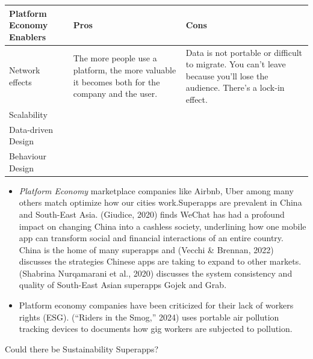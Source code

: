 \documentclass[
  letterpaper,
  DIV=11,
  numbers=noendperiod]{scrartcl}
\begin{document}
\begin{longtable}[]{@{}
  >{\raggedright\arraybackslash}p{}
  >{\raggedright\arraybackslash}p{}
  >{\raggedright\arraybackslash}p{}@{}}
\toprule\noalign{}
\begin{minipage}[b]{\linewidth}\raggedright
Platform Economy Enablers
\end{minipage} & \begin{minipage}[b]{\linewidth}\raggedright
Pros
\end{minipage} & \begin{minipage}[b]{\linewidth}\raggedright
Cons
\end{minipage} \\
\midrule\noalign{}
\endhead
\bottomrule\noalign{}
\endlastfoot
Network effects & The more people use a platform, the more valuable it
becomes both for the company and the user. & Data is not portable or
difficult to migrate. You can't leave because you'll lose the audience.
There's a lock-in effect. \\
Scalability & & \\
Data-driven Design & & \\
Behaviour Design & & \\
\end{longtable}

\begin{itemize}
\item
  \emph{Platform Economy} marketplace companies like Airbnb, Uber among
  many others match optimize how our cities work.Superapps are prevalent
  in China and South-East Asia. (Giudice, 2020) finds WeChat has had a
  profound impact on changing China into a cashless society, underlining
  how one mobile app can transform social and financial interactions of
  an entire country. China is the home of many superapps and (Vecchi \&
  Brennan, 2022) discusses the strategies Chinese apps are taking to
  expand to other markets. (Shabrina Nurqamarani et al., 2020) discusses
  the system consistency and quality of South-East Asian superapps Gojek
  and Grab.
\item
  Platform economy companies have been criticized for their lack of
  workers rights (ESG). ({``Riders in the Smog,''} 2024) uses portable
  air pollution tracking devices to documents how gig workers are
  subjected to pollution.
\end{itemize}

Could there be Sustainability Superapps?
\end{document}
